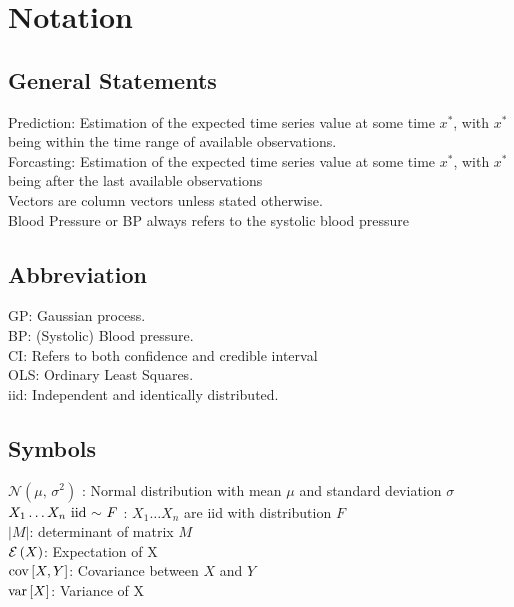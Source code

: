 \chapter*{Notation}
\label{c:Notation}


\section{General Statements}
Prediction: Estimation of the expected time series value at some time
$x^{\ast}$, with $x^{\ast}$ being within the time range of available observations.
\\
Forcasting: Estimation of the expected time series value at some time
$x^{\ast}$, with $x^{\ast}$ being after the last available observations \\
Vectors are column vectors unless stated otherwise. \\

Blood Pressure or BP always refers to the systolic blood pressure \\


\section{Abbreviation}\label{sec:abbreviation}
GP: Gaussian process. \\
BP: (Systolic) Blood pressure. \\
CI: Refers to both confidence and credible interval\\
OLS: Ordinary Least Squares. \\
iid: Independent and identically distributed.

\section{Symbols}\label{sec:symbols}
$\mathcal{N}(\mu,\,\sigma^{2})$ : Normal distribution with mean $\mu$ and standard deviation $\sigma$ \\
$X_1 \dots X_n \text{ iid }{\sim} \text{ } F$ : $X_1 \dots X_n$ are iid with distribution $F$ \\
$|M|$: determinant of matrix $M$ \\
$\ERW{X}$: Expectation of X \\
$\COV{X,Y}$: Covariance between $X$ and $Y$ \\
$\VAR{X}$: Variance of X



